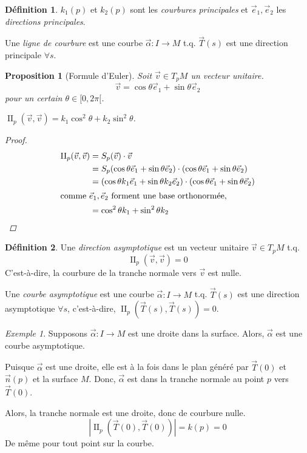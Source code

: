 \documentclass{report}
\newtheorem*{prop}{Proposition}
\theoremstyle{definition}
\newtheorem*{dfn}{D\'efinition}
\theoremstyle{remark}
\newtheorem*{exem}{Exemple}
\def\dff{\operatorname{II}}
\newcommand*{\abs}[1]{\left|#1\right|}
\begin{document}
	\begin{dfn}
		$k_1(p)$ et $k_2(p)$ sont les \emph{courbures principales} et $\vec e_1,\vec e_2$ les \emph{directions principales}.

		Une \emph{ligne de courbure} est une courbe $\vec\alpha:I\to M$ t.q. $\vec T(s)$ est une direction principale $\forall s$.
	\end{dfn}

	\begin{prop}[Formule d'Euler]
		Soit $\vec v\in T_pM$ un vecteur unitaire.
		\[ \vec v = \cos\theta\vec e_1 + \sin\theta\vec e_2 \]
		pour un certain $\theta\in[0,2\pi[$.

		$\dff_p(\vec v,\vec v) = k_1\cos^2\theta+k_2\sin^2\theta$.
		\begin{proof}
			\begin{align*}
				\dff_p(\vec v,\vec v)&= S_p(\vec v)\cdot\vec v\\
				&= S_p(\cos\theta\vec e_1+\sin\theta\vec e_2) \cdot (\cos\theta\vec e_1+\sin\theta\vec e_2)\\
				&= (\cos\theta k_1\vec e_1+\sin\theta k_2\vec e_2) \cdot (\cos\theta\vec e_1+\sin\theta\vec e_2)\\
				\shortintertext{comme $\vec e_1,\vec e_2$ forment une base orthonorm\'ee,}
				&= \cos^2\theta k_1 + \sin^2\theta k_2
			\end{align*}
		\end{proof}
	\end{prop}

	\begin{dfn}
		Une \emph{direction asymptotique} est un vecteur unitaire $\vec v\in T_pM$ t.q. \[ \dff_p(\vec v,\vec v)=0 \] C'est-\`a-dire, la courbure de la tranche normale vers $\vec v$ est nulle.

		Une \emph{courbe asymptotique} est une courbe $\vec\alpha:I\to M$ t.q. $\vec T(s)$ est une direction asymptotique $\forall s$, c'est-\`a-dire, $\dff_p(\vec T(s),\vec T(s))=0$.
	\end{dfn}

	\begin{exem}
		Supposons $\vec\alpha:I\to M$ est une droite dans la surface. Alors, $\vec\alpha$ est une courbe asymptotique.

		Puisque $\vec\alpha$ est une droite, elle est \`a la fois dans le plan g\'en\'er\'e par $\vec T(0)$ et $\vec n(p)$ et la surface $M$. Donc, $\vec\alpha$ est dans la tranche normale au point $p$ vers $\vec T(0)$.

		Alors, la tranche normale est une droite, donc de courbure nulle.
		\[ \abs{\dff_p(\vec T(0),\vec T(0))} = k(p)=0 \] De m\^eme pour tout point sur la courbe.
	\end{exem}
\end{document}
